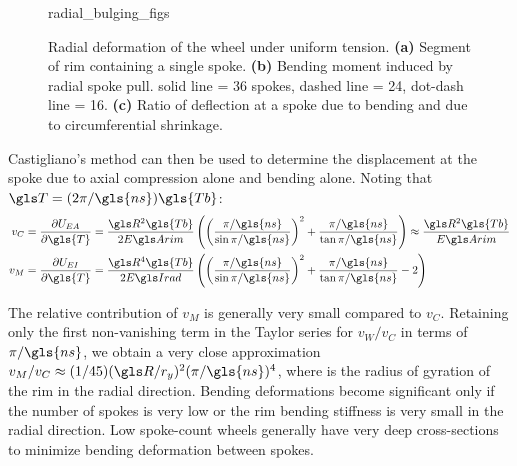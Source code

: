 \documentclass[\rootdir/thesis.tex]{subfiles}
\begin{document}
\begin{figure}
\centering
{radial_bulging_figs}
\caption{Radial deformation of the wheel under uniform tension. \textbf{(a)} Segment of rim containing a single spoke. \textbf{(b)} Bending moment induced by radial spoke pull. solid line = 36 spokes, dashed line = 24, dot-dash line = 16. \textbf{(c)} Ratio of deflection at a spoke due to bending and due to circumferential shrinkage.}
\label{fig:radial_bulging}
\end{figure}

Castigliano's method can then be used to determine the displacement at the spoke due to axial compression alone and bending alone. Noting that $\T = (2\pi/\gls{ns})\gls{Tb}$:
\begin{align}
v_C &= \frac{\partial U_{EA}}{\partial \gls{T}} = \frac{\R^2\gls{Tb}}{2\EA} \left( \left(\frac{\pi/\gls{ns}}{\sin{\pi/\gls{ns}}}\right)^2 +
    \frac{\pi/\gls{ns}}{\tan{\pi/\gls{ns}}}\right)
    \approx \frac{\R^2\gls{Tb}}{\EA}\label{eq:vC}\\
v_M &= \frac{\partial U_{EI}}{\partial \gls{T}} = \frac{\R^4\gls{Tb}}{2\EIr} \left( \left(\frac{\pi/\gls{ns}}{\sin{\pi/\gls{ns}}}\right)^2 +
    \frac{\pi/\gls{ns}}{\tan{\pi/\gls{ns}}} - 2\right)\label{eq:vM}
\end{align}

The relative contribution of $v_M$ is generally very small compared to $v_C$. Retaining only the first non-vanishing term in the Taylor series for $v_W/v_C$ in terms of $\pi/\gls{ns}$, we obtain a very close approximation $v_M/v_C\approx(1/45)(\R/\ry)^2(\pi/\gls{ns})^4$, where \ry is the radius of gyration of the rim in the radial direction. Bending deformations become significant only if the number of spokes is very low or the rim bending stiffness is very small in the radial direction. Low spoke-count wheels generally have very deep cross-sections to minimize bending deformation between spokes.
\end{document}
